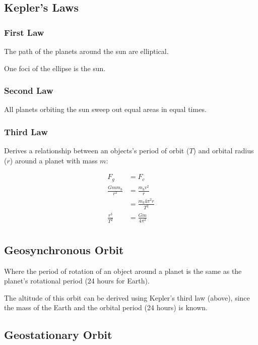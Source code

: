 \documentclass[a4paper,11pt]{report}
\begin{document}
\subsection{Kepler's Laws}

\subsubsection{First Law}

The path of the planets around the sun are elliptical.

One foci of the ellipse is the sun.

\subsubsection{Second Law}

All planets orbiting the sun sweep out equal areas in equal times.

\subsubsection{Third Law}

Derives a relationship between an objects's period of orbit ($T$) and orbital
radius ($r$) around a planet with mass $m$:

$$
\begin{aligned}
F_g & = F_c \\
\frac{G m m_b}{r^2} & = \frac{m_b v^2}{r} \\
& = \frac{m_b 4 \pi^2 r}{T^2} \\
\frac{r^3}{T^2} & = \frac{G m}{4 \pi^2} \\
\end{aligned}
$$

\subsection{Geosynchronous Orbit}

Where the period of rotation of an object around a planet is the same as the
planet's rotational period (24 hours for Earth).

The altitude of this orbit can be derived using Kepler's third law (above),
since the mass of the Earth and the orbital period (24 hours) is known.

\subsection{Geostationary Orbit}
\end{document}

